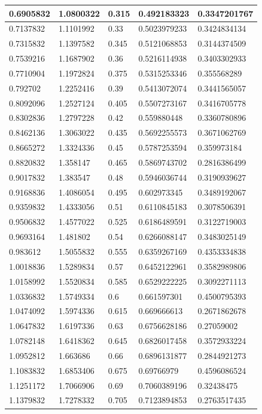\documentclass[coverpage]{article}
\begin{document}
\begin{table}[!ht]
\begin{tabular}{|l|l|l|l|l|}
			0.6905832 & 1.0800322 & 0.315 & 0.492183323 & 0.3347201767 \\ \hline
			0.7137832 & 1.1101992 & 0.33 & 0.5023979233 & 0.3424834134 \\ \hline
			0.7315832 & 1.1397582 & 0.345 & 0.5121068853 & 0.3144374509 \\ \hline
			0.7539216 & 1.1687902 & 0.36 & 0.5216114938 & 0.3403302933 \\ \hline
			0.7710904 & 1.1972824 & 0.375 & 0.5315253346 & 0.355568289 \\ \hline
			0.792702 & 1.2252416 & 0.39 & 0.5413072074 & 0.3441565057 \\ \hline
			0.8092096 & 1.2527124 & 0.405 & 0.5507273167 & 0.3416705778 \\ \hline
			0.8302836 & 1.2797228 & 0.42 & 0.559880448 & 0.3360780896 \\ \hline
			0.8462136 & 1.3063022 & 0.435 & 0.5692255573 & 0.3671062769 \\ \hline
			0.8665272 & 1.3324336 & 0.45 & 0.5787253594 & 0.359973184 \\ \hline
			0.8820832 & 1.358147 & 0.465 & 0.5869743702 & 0.2816386499 \\ \hline
			0.9017832 & 1.383547 & 0.48 & 0.5946036744 & 0.3190939627 \\ \hline
			0.9168836 & 1.4086054 & 0.495 & 0.602973345 & 0.3489192067 \\ \hline
			0.9359832 & 1.4333056 & 0.51 & 0.6110845183 & 0.3078506391 \\ \hline
			0.9506832 & 1.4577022 & 0.525 & 0.6186489591 & 0.3122719003 \\ \hline
			0.9693164 & 1.481802 & 0.54 & 0.6266088147 & 0.3483025149 \\ \hline
			0.983612 & 1.5055832 & 0.555 & 0.6359267169 & 0.4353334838 \\ \hline
			1.0018836 & 1.5289834 & 0.57 & 0.6452122961 & 0.3582989806 \\ \hline
			1.0158992 & 1.5520834 & 0.585 & 0.6529222225 & 0.3092271113 \\ \hline
			1.0336832 & 1.5749334 & 0.6 & 0.661597301 & 0.4500795393 \\ \hline
			1.0474092 & 1.5974336 & 0.615 & 0.669666613 & 0.2671862678 \\ \hline
			1.0647832 & 1.6197336 & 0.63 & 0.6756628186 & 0.27059002 \\ \hline
			1.0782148 & 1.6418362 & 0.645 & 0.6826017458 & 0.3572933224 \\ \hline
			1.0952812 & 1.663686 & 0.66 & 0.6896131877 & 0.2844921273 \\ \hline
			1.1083832 & 1.6853406 & 0.675 & 0.69766979 & 0.4596086524 \\ \hline
			1.1251172 & 1.7066906 & 0.69 & 0.7060389196 & 0.32438475 \\ \hline
			1.1379832 & 1.7278332 & 0.705 & 0.7123894853 & 0.2763517435 \\ \hline
		\end{tabular}
	\end{table}
	
\end{document}
